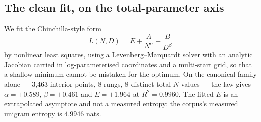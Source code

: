 \documentclass[11pt,a4paper]{article}
\begin{document}
\subsection{The clean fit, on the total-parameter axis}
\label{sec:act4-fit}

We fit the Chinchilla-style form
\begin{equation}
L(N, D) = E + \frac{A}{N^{\alpha}} + \frac{B}{D^{\beta}}
\end{equation}
by nonlinear least squares, using a Levenberg--Marquardt solver with an
analytic Jacobian carried in log-parameterised coordinates and a multi-start
grid, so that a shallow minimum cannot be mistaken for the optimum. On the
canonical family alone --- 3,463 interior points, 8 rungs, 8 distinct total-$N$
values --- the law gives $\alpha = +0.589$, $\beta = +0.461$ and $E = +1.964$
at $R^2 = 0.9960$. The fitted $E$ is an extrapolated asymptote and not a
measured entropy: the corpus's measured unigram entropy is $4.9946$ nats.
\end{document}
